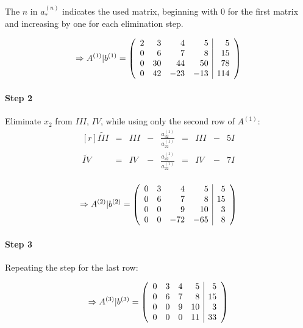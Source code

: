 The $n$ in $a_{*}^{(n)}$ indicates the used matrix, beginning with $0$ for the 
first matrix and increasing by one for each elimination step.

\[
	\Rightarrow
	A^{(1)}|b^{(1)} = 
	\left(\begin{array}{r r r r | r}
			2 &  3 &   4 &   5 &   5 \\
			0 &  6 &   7 &   8 &  15 \\
			0 & 30 &  44 &  50 &  78 \\
			0 & 42 & -23 & -13 & 114
	\end{array}\right)
\]

\paragraph{Step 2}

Eliminate $x_2$ from $III$, $IV$, while using only the second row of $A^{(1)}$:
\[
\begin{matrix*}[r]
	\tilde{III} & = & III & - & \frac{a_{32}^{(1)}}{a_{22}^{(1)}} & = & III & - & 5I \\
	\tilde{IV}  & = & IV  & - & \frac{a_{42}^{(1)}}{a_{22}^{(1)}} & = & IV  & - & 7I \\
\end{matrix*}
\]

\[
	\Rightarrow
	A^{(2)}|b^{(2)} = 
	\left(\begin{array}{r r r r | r}
			0 & 3 &   4 &   5 &  5 \\
			0 & 6 &   7 &   8 & 15 \\
			0 & 0 &   9 &  10 &  3 \\
			0 & 0 & -72 & -65 &  8
	\end{array}\right)
\]

\paragraph{Step 3}
Repeating the step for the last row:

\[
	\Rightarrow
	A^{(3)}|b^{(3)} = 
	\left(\begin{array}{r r r r | r}
			0 & 3 &  4 &  5 &  5 \\
			0 & 6 &  7 &  8 & 15 \\
			0 & 0 &  9 & 10 &  3 \\
			0 & 0 &  0 & 11 & 33
	\end{array}\right)
\]




